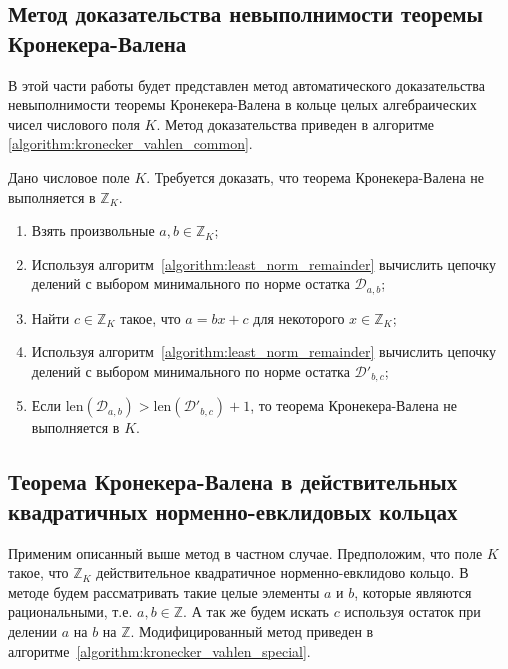 \documentclass[_00_autoref.tex]{subfiles}
\begin{document}
\subsection{Метод доказательства невыполнимости теоремы Кронекера-Валена}

В этой части работы будет представлен метод автоматического доказательства невыполнимости теоремы Кронекера-Валена в кольце целых алгебраических чисел числового поля $K$.
Метод доказательства приведен в алгоритме \ref{algorithm:kronecker_vahlen_common}.

\begin{algorithm}\label{algorithm:kronecker_vahlen_common}
    Дано числовое поле $K$.
    Требуется доказать, что теорема Кронекера-Валена не выполняется в $\mathbb{Z}_K$.
    
    \begin{enumerate}
        \item Взять произвольные $a, b \in \mathbb{Z}_K$;

        \item Используя алгоритм~\ref{algorithm:least_norm_remainder} вычислить цепочку делений с выбором минимального по норме остатка $\mathcal{D}_{a, b}$;

        \item Найти $c \in \mathbb{Z}_K$ такое, что $a = bx + c$ для некоторого $x \in \mathbb{Z}_K$;

        \item Используя алгоритм~\ref{algorithm:least_norm_remainder} вычислить цепочку делений с выбором минимального по норме остатка $\mathcal{D}'_{b,c}$;

        \item Если $\textrm{len}(\mathcal{D}_{a, b}) > \textrm{len}(\mathcal{D}'_{b, c}) + 1$, то теорема Кронекера-Валена не выполняется в $K$.
    \end{enumerate}
\end{algorithm}

\subsection{Теорема Кронекера-Валена в действительных квадратичных норменно-евклидовых кольцах}

Применим описанный выше метод в частном случае.
Предположим, что поле $K$ такое, что $\mathbb{Z}_K$ действительное квадратичное норменно-евклидово кольцо.
В методе будем рассматривать такие целые элементы $a$ и $b$, которые являются рациональными, т.е. $a, b \in \mathbb{Z}$.
А так же будем искать $c$ используя остаток при делении $a$ на $b$ на $\mathbb{Z}$.
Модифицированный метод приведен в алгоритме~\ref{algorithm:kronecker_vahlen_special}.
\end{document}
